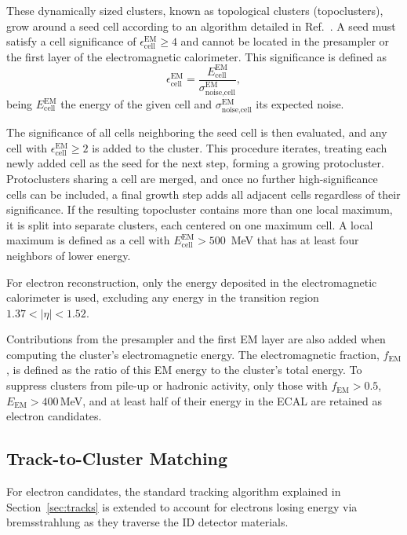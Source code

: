 These dynamically sized clusters, known as topological clusters (topoclusters), grow around a seed cell according to an algorithm detailed in Ref.~\cite{fix_clust}. A seed must satisfy a cell significance of $\epsilon_{\text{cell}}^{\text{EM}} \geq 4$
and cannot be located in the presampler or the first layer of the electromagnetic calorimeter. This significance is defined as
\begin{equation}
  \epsilon_{\text{cell}}^{\text{EM}} = \frac{E_{\text{cell}}^{\text{EM}}}{\sigma^{\text{EM}}_{\text{noise,cell}}},
\end{equation}
being \(E_{\text{cell}}^{\text{EM}}\) the energy of the given cell and \(\sigma^{\text{EM}}_{\text{noise,cell}}\) its expected noise.

The significance of all cells neighboring the seed cell is then evaluated, and any cell with $\epsilon_{\text{cell}}^{\text{EM}} \geq 2$ is added to the cluster. This procedure iterates, treating each newly added cell as the seed for the next step, forming a growing protocluster. Protoclusters sharing a cell are merged, and once no further high-significance cells can be included, a final growth step adds all adjacent cells regardless of their significance. If the resulting topocluster contains more than one local maximum, it is split into separate clusters, each centered on one maximum cell. A local maximum is defined as a cell with \(E_{\text{cell}}^{\text{EM}}>500\)~MeV that has at least four neighbors of lower energy.

For electron reconstruction, only the energy deposited in the electromagnetic calorimeter is used, excluding any energy in the transition region \(1.37<|\eta|<1.52\). 

Contributions from the presampler and the first EM layer are also added when computing the cluster’s electromagnetic energy. The electromagnetic fraction, \(f_{\text{EM}}\), is defined as the ratio of this EM energy to the cluster’s total energy. To suppress clusters from pile-up or hadronic activity, only those with \(f_{\text{EM}}>0.5\), \(E_{\text{EM}}>400\)\,MeV, and at least half of their energy in the ECAL are retained as electron candidates.  

\subsection{Track-to-Cluster Matching}

For electron candidates, the standard tracking algorithm explained in Section~\ref{sec:tracks} is extended to account for electrons losing energy via bremsstrahlung as they traverse the ID detector materials. 

